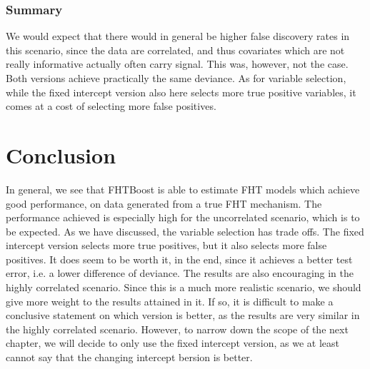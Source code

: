 \subsubsection{Summary}
We would expect that there would in general be higher false discovery rates in this scenario, since the data are correlated, and thus covariates which are not really informative actually often carry signal.
This was, however, not the case.
Both versions achieve practically the same deviance.
As for variable selection, while the fixed intercept version also here selects more true positive variables, it comes at a cost of selecting more false positives.

\section{Conclusion}
In general, we see that FHTBoost is able to estimate FHT models which achieve good performance, on data generated from a true FHT mechanism.
The performance achieved is especially high for the uncorrelated scenario, which is to be expected.
As we have discussed, the variable selection has trade offs.
The fixed intercept version selects more true positives, but it also selects more false positives.
It does seem to be worth it, in the end, since it achieves a better test error, i.e. a lower difference of deviance.
The results are also encouraging in the highly correlated scenario.
Since this is a much more realistic scenario, we should give more weight to the results attained in it.
If so, it is difficult to make a conclusive statement on which version is better, as the results are very similar in the highly correlated scenario.
However, to narrow down the scope of the next chapter, we will decide to only use the fixed intercept version, as we at least cannot say that the changing intercept bersion is better.